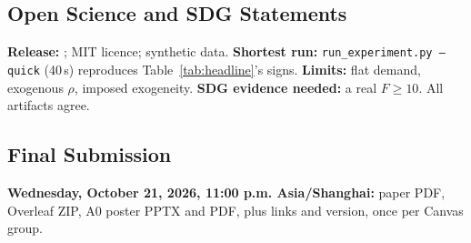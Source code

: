 \subsection*{Open Science and SDG Statements}
\textbf{Release:} \TestedRelease; MIT licence; synthetic data. \textbf{Shortest run:} \texttt{run\_experiment.py --quick} (40\,s) reproduces Table~\ref{tab:headline}'s signs. \textbf{Limits:} flat demand, exogenous $\rho$, imposed exogeneity. \textbf{SDG evidence needed:} a real $F\ge10$. All artifacts agree.

\subsection*{Final Submission}
\textbf{Wednesday, October 21, 2026, 11:00 p.m. Asia/Shanghai:} paper PDF, Overleaf ZIP, A0 poster PPTX and PDF, plus links and version, once per Canvas group.

